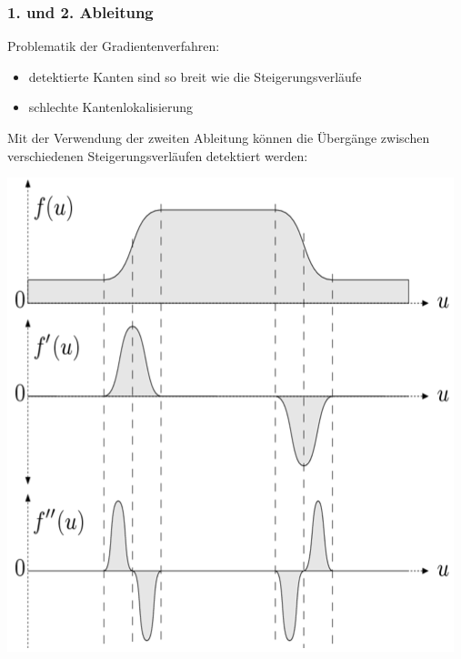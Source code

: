 \documentclass[10pt]{article}
\begin{document}
\subsubsection{1. und 2. Ableitung}
Problematik der Gradientenverfahren:
\begin{itemize}
	\item detektierte Kanten sind so breit wie die Steigerungsverläufe
	\item schlechte Kantenlokalisierung
\end{itemize}
Mit der Verwendung der zweiten Ableitung können die Übergänge zwischen verschiedenen Steigerungsverläufen detektiert werden:
\begin{center}
	\includegraphics[scale=0.3]{2ableitung.png}
\end{center}
\end{document}
